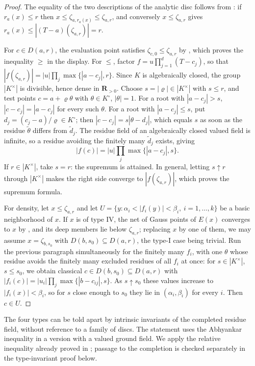 \begin{proof}
The equality of the two descriptions of the analytic disc follows from
: if $r_a(x)\leq r$ then
$x\leq\zeta_{a,r_a(x)}\leq\zeta_{a,r}$, and conversely
$x\le\zeta_{a,r}$ gives
$r_a(x)\le|(T-a)(\zeta_{a,r})|=r$.

For $c\in D(a,r)$, the evaluation point satisfies
$\zeta_{c,0}\leq\zeta_{a,r}$ by ,
which proves the inequality $\geq$ in the display.  For $\leq$,
factor $f=u\prod_{j=1}^d(T-c_j)$, so that
$|f(\zeta_{a,r})|=|u|\prod_j\max\{|a-c_j|,r\}$.  Since $K$ is
algebraically closed, the group $|K^\times|$ is divisible, hence dense
in $\mathbf R_{>0}$.  Choose $s=|\varrho|\in|K^\times|$ with
$s\leq r$, and test points $c=a+\varrho\theta$ with
$\theta\in K^\circ$, $|\theta|=1$.  For a root with $|a-c_j|>s$,
$|c-c_j|=|a-c_j|$ for every such $\theta$.  For a root with
$|a-c_j|\leq s$, put $d_j=(c_j-a)/\varrho\in K^\circ$; then
$|c-c_j|=s|\theta-d_j|$, which equals $s$ as soon as the residue
$\tilde\theta$ differs from $\tilde d_j$.  The residue field of an
algebraically closed valued field is infinite, so a residue avoiding
the finitely many $\tilde d_j$ exists, giving
\[
 |f(c)|=|u|\prod_j\max\{|a-c_j|,s\}.
\]
If $r\in|K^\times|$, take $s=r$: the supremum is attained.  In
general, letting $s\uparrow r$ through $|K^\times|$ makes the right
side converge to $|f(\zeta_{a,r})|$, which proves the supremum
formula.

For density, let $x\leq\zeta_{a,r}$ and let
$U=\{y:\alpha_i<|f_i(y)|<\beta_i,\ i=1,\ldots,k\}$ be a basic
neighborhood of $x$.  If $x$ is of type IV, the net of Gauss points
of $E(x)$ converges to $x$ by
, and its deep members lie below
$\zeta_{a,r}$; replacing $x$ by one of them, we may assume
$x=\zeta_{b,s_0}$ with $D(b,s_0)\subseteq D(a,r)$, the type-I case
being trivial.  Run the previous paragraph simultaneously for the
finitely many $f_i$, with one $\theta$ whose residue avoids the
finitely many excluded residues of all $f_i$ at once: for
$s\in|K^\times|$, $s\le s_0$, we obtain classical
$c\in D(b,s_0)\subseteq D(a,r)$ with
$|f_i(c)|=|u_i|\prod_j\max\{|b-c_{ij}|,s\}$.  As $s\uparrow s_0$
these values increase to $|f_i(x)|<\beta_i$, so for $s$ close
enough to $s_0$ they lie in $(\alpha_i,\beta_i)$ for every $i$.
Then $c\in U$.
\end{proof}

The four types can be told apart by intrinsic invariants of the
completed residue field, without reference to a family of discs.  The
statement uses the Abhyankar inequality in a version with a valued
ground field. We apply the relative inequality already proved in
; passage to the completion is checked
separately in the type-invariant proof below.

